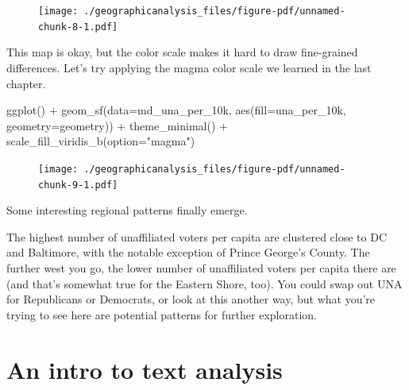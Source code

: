 \documentclass[
  letterpaper,
  DIV=11,
  numbers=noendperiod]{scrreprt}
\newenvironment{Shaded}{\begin{snugshade}}{\end{snugshade}}
\newcommand{\AttributeTok}[1]{\textcolor[rgb]{0.40,0.45,0.13}{#1}}
\newcommand{\FunctionTok}[1]{\textcolor[rgb]{0.28,0.35,0.67}{#1}}
\newcommand{\NormalTok}[1]{\textcolor[rgb]{0.00,0.23,0.31}{#1}}
\newcommand{\SpecialCharTok}[1]{\textcolor[rgb]{0.37,0.37,0.37}{#1}}
\newcommand{\StringTok}[1]{\textcolor[rgb]{0.13,0.47,0.30}{#1}}
\begin{document}
\begin{figure}[H]

{\centering \texttt{[image: ./geographicanalysis\_files/figure-pdf/unnamed-chunk-8-1.pdf]}

}

\end{figure}

This map is okay, but the color scale makes it hard to draw fine-grained
differences. Let's try applying the magma color scale we learned in the
last chapter.

\begin{Shaded}
\begin{Highlighting}[]
\FunctionTok{ggplot}\NormalTok{() }\SpecialCharTok{+}
  \FunctionTok{geom\_sf}\NormalTok{(}\AttributeTok{data=}\NormalTok{md\_una\_per\_10k, }\FunctionTok{aes}\NormalTok{(}\AttributeTok{fill=}\NormalTok{una\_per\_10k, }\AttributeTok{geometry=}\NormalTok{geometry)) }\SpecialCharTok{+}
  \FunctionTok{theme\_minimal}\NormalTok{() }\SpecialCharTok{+}
  \FunctionTok{scale\_fill\_viridis\_b}\NormalTok{(}\AttributeTok{option=}\StringTok{"magma"}\NormalTok{)}
\end{Highlighting}
\end{Shaded}

\begin{figure}[H]

{\centering \texttt{[image: ./geographicanalysis\_files/figure-pdf/unnamed-chunk-9-1.pdf]}

}

\end{figure}

Some interesting regional patterns finally emerge.

The highest number of unaffiliated voters per capita are clustered close
to DC and Baltimore, with the notable exception of Prince George's
County. The further west you go, the lower number of unaffiliated voters
per capita there are (and that's somewhat true for the Eastern Shore,
too). You could swap out UNA for Republicans or Democrats, or look at
this another way, but what you're trying to see here are potential
patterns for further exploration.


\hypertarget{an-intro-to-text-analysis}{%
\chapter{An intro to text analysis}\label{an-intro-to-text-analysis}}
\end{document}
